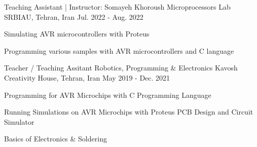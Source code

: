 \begin{cventries}

\cventry
{Teaching Assistant | Instructor: Somayeh Khoroush} %
{Microprocessors Lab} %
{SRBIAU, Tehran, Iran} %
{Jul. 2022 - Aug. 2022} %
{ %
\begin{cvitems}
\item {Simulating AVR microcontrollers with Proteus}
\item {Programming various samples with AVR microcontrollers and C language}
\end{cvitems}
}


\cventry
{Teacher / Teaching Assitant} %
{Robotics, Programming \& Electronics} %
{Kavosh Creativity House, Tehran, Iran} %
{May 2019 - Dec. 2021} %
{ %
\begin{cvitems}
\item {Programming for AVR Microchips with C Programming Language}
\item {Running Simulations on AVR Microchips with Proteus PCB Design and Circuit Simulator}
\item {Basics of Electronics \& Soldering}
\end{cvitems}
}


\end{cventries}
